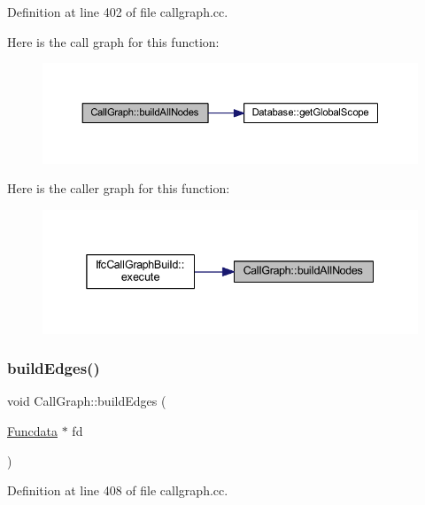 Definition at line 402 of file callgraph.\+cc.

Here is the call graph for this function\+:
\nopagebreak
\begin{figure}[H]
\begin{center}
\leavevmode
\includegraphics[width=350pt]{class_call_graph_ad551fc740c138722552a84e314a37d84_cgraph}
\end{center}
\end{figure}
Here is the caller graph for this function\+:
\nopagebreak
\begin{figure}[H]
\begin{center}
\leavevmode
\includegraphics[width=338pt]{class_call_graph_ad551fc740c138722552a84e314a37d84_icgraph}
\end{center}
\end{figure}
\mbox{\label{class_call_graph_a3cc813013efc9165d2f0496c9de488e4}} 
\subsubsection{\texorpdfstring{buildEdges()}{buildEdges()}}
{\footnotesize\ttfamily void Call\+Graph\+::build\+Edges (\begin{DoxyParamCaption}\item[{\mbox{\hyperlink{class_funcdata}{Funcdata}} $\ast$}]{fd }\end{DoxyParamCaption})}



Definition at line 408 of file callgraph.\+cc.

